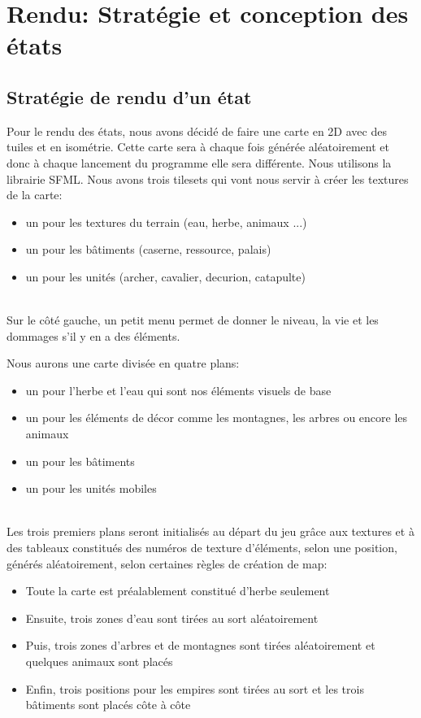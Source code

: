 \documentclass[12pt,a4paper]{article}
\begin{document}
\newpage
\section{Rendu: Stratégie et conception des états}
\subsection{Stratégie de rendu d'un état}

Pour le rendu des états, nous avons décidé de faire une carte en 2D avec des tuiles et en isométrie. Cette carte sera à chaque fois générée aléatoirement et donc à chaque lancement du programme elle sera différente. Nous utilisons la librairie SFML. Nous avons trois tilesets qui vont nous servir à créer les textures de la carte: 
\begin{itemize}
\item un pour les textures du terrain (eau, herbe, animaux ...)
\item un pour les bâtiments (caserne, ressource, palais)
\item un pour les unités (archer, cavalier, decurion, catapulte)
\end{itemize}\\

Sur le côté gauche, un petit menu permet de donner le niveau, la vie et les dommages s'il y en a des éléments.

Nous aurons une carte divisée en quatre plans: 
\begin{itemize}
\item un pour l'herbe et l'eau qui sont nos éléments visuels de base
\item un pour les éléments de décor comme les montagnes, les arbres ou encore les animaux
\item un pour les bâtiments
\item un pour les unités mobiles
\end{itemize}\\

Les trois premiers plans seront initialisés au départ du jeu grâce aux textures et à des tableaux constitués des numéros de texture d'éléments, selon une position, générés aléatoirement, selon certaines règles de création de map:
\begin{itemize}
\item Toute la carte est préalablement constitué d'herbe seulement
\item Ensuite, trois zones d'eau sont tirées au sort aléatoirement
\item Puis, trois zones d'arbres et de montagnes sont tirées  aléatoirement et quelques animaux sont placés
\item Enfin, trois positions pour les empires sont tirées au sort et les trois bâtiments sont placés côte à côte
\end{itemize}\\
\end{document}
